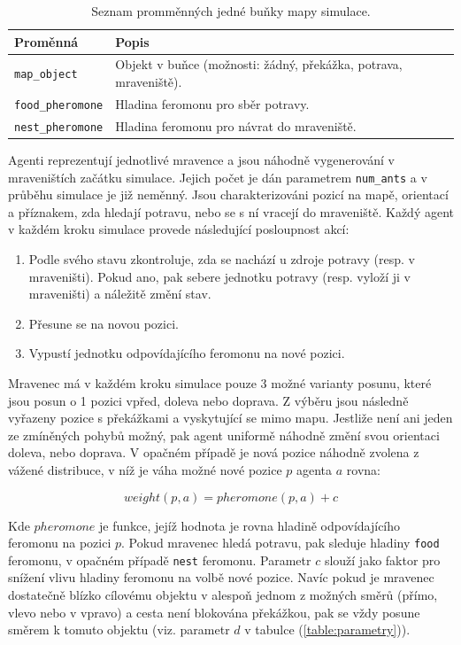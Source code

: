 \documentclass[10pt,a4paper,twocolumn]{article}
\begin{document}
\begin{table}[t]
  \centering %
  \begin{tabular}{l p{5cm}}
  \toprule
  Proměnná & Popis \\
  \midrule
    \texttt{map\_object} & Objekt v buňce (možnosti:
    žádný, překážka, potrava, mraveniště). \\
    \texttt{food\_pheromone} & Hladina feromonu pro sběr potravy.\\
    \texttt{nest\_pheromone} & Hladina feromonu pro návrat do mraveniště.\\	
  \bottomrule
  \end{tabular}
  \caption{Seznam promměnných jedné buňky mapy simulace.} \label{table:mapa} 
\end{table}


Agenti reprezentují jednotlivé mravence a jsou náhodně 
vygenerování v mraveništích začátku simulace. Jejich počet je dán 
parametrem \texttt{num\_ants} a 
v průběhu simulace je již neměnný. Jsou charakterizováni pozicí na mapě,
orientací a příznakem, zda hledají potravu, nebo se s ní vracejí do mraveniště.
Každý agent v každém kroku simulace provede následující posloupnost akcí:

\begin{enumerate}
  \item Podle svého stavu zkontroluje, zda se nachází u zdroje potravy 
  (resp. v mraveništi). Pokud ano, pak sebere jednotku potravy 
  (resp. vyloží ji v mraveništi) a náležitě změní stav.
  \item Přesune se na novou pozici.
  \item Vypustí jednotku odpovídajícího feromonu na nové pozici.
\end{enumerate}

Mravenec má v každém kroku simulace pouze 3 možné varianty posunu, které 
jsou posun o 1 pozici vpřed, doleva nebo doprava. Z výběru jsou následně vyřazeny
pozice s překážkami a vyskytující se mimo mapu. Jestliže není ani jeden ze zmíněných 
pohybů možný, pak agent uniformě náhodně změní svou orientaci doleva, nebo
doprava. V opačném případě je nová pozice náhodně zvolena z vážené distribuce, 
v níž je váha možné nové pozice $p$ agenta $a$ rovna:

\begin{equation}
  weight(p, a) = pheromone(p, a) + c
\end{equation}

Kde $pheromone$ je funkce, jejíž hodnota je rovna hladině odpovídajícího 
feromonu na pozici $p$. Pokud mravenec hledá potravu, pak sleduje hladiny \texttt{food}
feromonu, v opačném případě \texttt{nest} feromonu.
Parametr $c$ slouží jako faktor pro snížení vlivu hladiny feromonu na volbě
nové pozice. Navíc pokud je mravenec dostatečně blízko cílovému objektu
v alespoň jednom z možných směrů (přímo, vlevo nebo v vpravo) a cesta
není blokována překážkou, pak se vždy posune směrem k tomuto objektu (viz.
parametr $d$ v tabulce (\ref{table:parametry})). 
\end{document}
